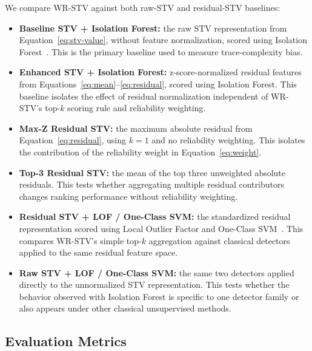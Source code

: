 We compare WR-STV against both raw-STV and residual-STV baselines:

\begin{itemize}
    \item \textbf{Baseline STV + Isolation Forest:} the raw STV
    representation from Equation~\ref{eq:stv-value}, without feature
    normalization, scored using Isolation Forest~\cite{liu2008iforest}.
    This is the primary baseline used to measure trace-complexity bias.

    \item \textbf{Enhanced STV + Isolation Forest:} z-score-normalized
    residual features from Equations~\ref{eq:mean}--\ref{eq:residual},
    scored using Isolation Forest. This baseline isolates the effect of
    residual normalization independent of WR-STV's top-\(k\) scoring
    rule and reliability weighting.

    \item \textbf{Max-Z Residual STV:} the maximum absolute residual from
    Equation~\ref{eq:residual}, using \(k=1\) and no reliability
    weighting. This isolates the contribution of the reliability weight
    in Equation~\ref{eq:weight}.

    \item \textbf{Top-3 Residual STV:} the mean of the top three
    unweighted absolute residuals. This tests whether aggregating
    multiple residual contributors changes ranking performance without
    reliability weighting.

    \item \textbf{Residual STV + LOF / One-Class SVM:} the standardized
    residual representation scored using Local Outlier Factor
    \cite{breunig2000lof} and One-Class SVM~\cite{scholkopf2001ocsvm}.
    This compares WR-STV's simple top-\(k\) aggregation against classical
    detectors applied to the same residual feature space.

    \item \textbf{Raw STV + LOF / One-Class SVM:} the same two detectors
    applied directly to the unnormalized STV representation. This tests
    whether the behavior observed with Isolation Forest is specific to
    one detector family or also appears under other classical
    unsupervised methods.
\end{itemize}

\subsection{Evaluation Metrics}

